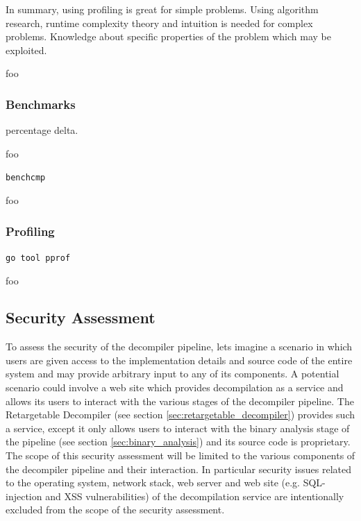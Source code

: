 In summary, using profiling is great for simple problems. Using algorithm research, runtime complexity theory and intuition is needed for complex problems. Knowledge about specific properties of the problem which may be exploited.

foo

\subsubsection{Benchmarks}

percentage delta.

foo

\texttt{benchcmp}

foo

\subsubsection{Profiling}



\texttt{go tool pprof}

foo


\subsection{Security Assessment}


To assess the security of the decompiler pipeline, lets imagine a scenario in which users are given access to the implementation details and source code of the entire system and may provide arbitrary input to any of its components. A potential scenario could involve a web site which provides decompilation as a service and allows its users to interact with the various stages of the decompiler pipeline. The Retargetable Decompiler (see section \ref{sec:retargetable_decompiler}) provides such a service, except it only allows users to interact with the binary analysis stage of the pipeline (see section \ref{sec:binary_analysis}) and its source code is proprietary. The scope of this security assessment will be limited to the various components of the decompiler pipeline and their interaction. In particular security issues related to the operating system, network stack, web server and web site (e.g. SQL-injection and XSS vulnerabilities) of the decompilation service are intentionally excluded from the scope of the security assessment.

